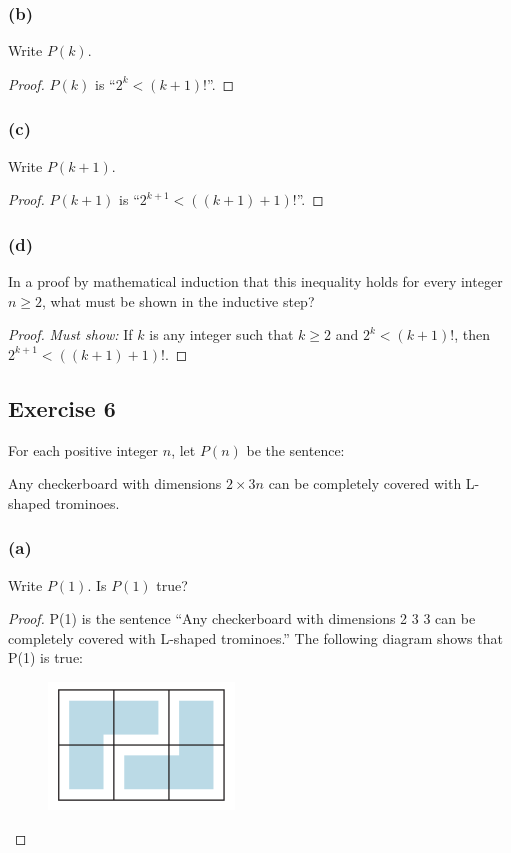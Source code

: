 \documentclass[14pt]{extarticle}
\begin{document}
\subsubsection{(b)}
Write $P(k)$.

\begin{proof}
$P(k)$ is ``$2^k < (k + 1)!$''.
\end{proof}

\subsubsection{(c)}
Write $P(k + 1)$.

\begin{proof}
$P(k + 1)$ is ``$2^{k + 1} < ((k + 1) + 1)!$''.
\end{proof}

\subsubsection{(d)}
In a proof by mathematical induction that this inequality holds for every integer $n \geq 2$, what must be shown in the inductive step?

\begin{proof}
{\it Must show:} If $k$ is any integer such that $k \geq 2$ and $2^k < (k + 1)!$, then $2^{k + 1} < ((k + 1) + 1)!$.
\end{proof}

\subsection{Exercise 6}
For each positive integer $n$, let $P(n)$ be the sentence:

Any checkerboard with dimensions $2 \times 3n$ can be completely covered with L-shaped trominoes.

\subsubsection{(a)}
Write $P(1)$. Is $P(1)$ true?

\begin{proof}
P(1) is the sentence “Any checkerboard with
dimensions 2 3 3 can be completely covered with
L-shaped trominoes.” The following diagram shows
that P(1) is true:
\begin{figure}[ht!]
\centering
\includegraphics[scale=0.5]{../images/5.3.6.a.png}
\end{figure}
\end{proof}
\end{document}
